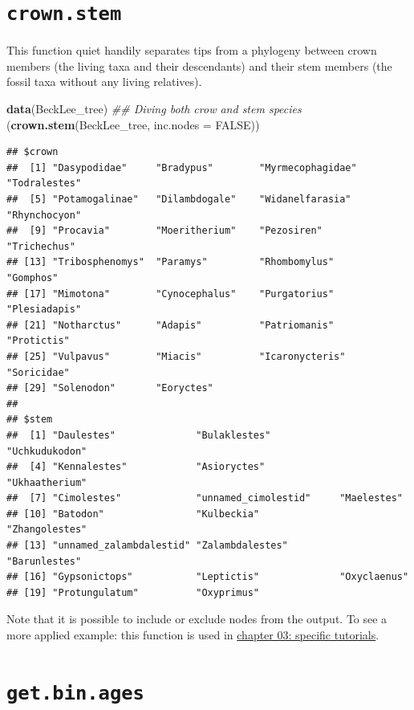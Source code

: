 \documentclass[]{book}
\newenvironment{Shaded}{\begin{snugshade}}{\end{snugshade}}
\newcommand{\CommentTok}[1]{\textcolor[rgb]{0.56,0.35,0.01}{\textit{#1}}}
\newcommand{\DataTypeTok}[1]{\textcolor[rgb]{0.13,0.29,0.53}{#1}}
\newcommand{\KeywordTok}[1]{\textcolor[rgb]{0.13,0.29,0.53}{\textbf{#1}}}
\newcommand{\NormalTok}[1]{#1}
\newcommand{\OtherTok}[1]{\textcolor[rgb]{0.56,0.35,0.01}{#1}}
\begin{document}
\hypertarget{crown.stem}{%
\section{\texorpdfstring{\texttt{crown.stem}}{crown.stem}}\label{crown.stem}}

This function quiet handily separates tips from a phylogeny between crown members (the living taxa and their descendants) and their stem members (the fossil taxa without any living relatives).

\begin{Shaded}
\begin{Highlighting}[]
\KeywordTok{data}\NormalTok{(BeckLee_tree)}
\CommentTok{## Diving both crow and stem species}
\NormalTok{(}\KeywordTok{crown.stem}\NormalTok{(BeckLee_tree, }\DataTypeTok{inc.nodes =} \OtherTok{FALSE}\NormalTok{))}
\end{Highlighting}
\end{Shaded}

\begin{verbatim}
## $crown
##  [1] "Dasypodidae"     "Bradypus"        "Myrmecophagidae" "Todralestes"    
##  [5] "Potamogalinae"   "Dilambdogale"    "Widanelfarasia"  "Rhynchocyon"    
##  [9] "Procavia"        "Moeritherium"    "Pezosiren"       "Trichechus"     
## [13] "Tribosphenomys"  "Paramys"         "Rhombomylus"     "Gomphos"        
## [17] "Mimotona"        "Cynocephalus"    "Purgatorius"     "Plesiadapis"    
## [21] "Notharctus"      "Adapis"          "Patriomanis"     "Protictis"      
## [25] "Vulpavus"        "Miacis"          "Icaronycteris"   "Soricidae"      
## [29] "Solenodon"       "Eoryctes"       
## 
## $stem
##  [1] "Daulestes"              "Bulaklestes"            "Uchkudukodon"          
##  [4] "Kennalestes"            "Asioryctes"             "Ukhaatherium"          
##  [7] "Cimolestes"             "unnamed_cimolestid"     "Maelestes"             
## [10] "Batodon"                "Kulbeckia"              "Zhangolestes"          
## [13] "unnamed_zalambdalestid" "Zalambdalestes"         "Barunlestes"           
## [16] "Gypsonictops"           "Leptictis"              "Oxyclaenus"            
## [19] "Protungulatum"          "Oxyprimus"
\end{verbatim}

Note that it is possible to include or exclude nodes from the output.
To see a more applied example: this function is used in \protect\hyperlink{custom-subsets}{chapter 03: specific tutorials}.

\hypertarget{get.bin.ages}{%
\section{\texorpdfstring{\texttt{get.bin.ages}}{get.bin.ages}}\label{get.bin.ages}}
\end{document}
